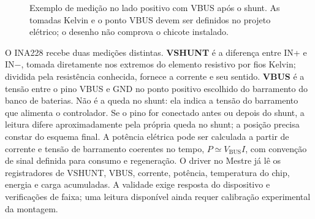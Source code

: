 \begin{figure}[htbp]\centering
{}
\caption{Exemplo de medição no lado positivo com VBUS após o shunt. As tomadas Kelvin e o ponto VBUS devem ser definidos no projeto elétrico; o desenho não comprova o chicote instalado.}\label{fig:shunt-kelvin}
\end{figure}

O INA228 recebe duas medições distintas. \textbf{VSHUNT} é a diferença entre IN+ e IN$-$, tomada diretamente nos extremos do elemento resistivo por fios Kelvin; dividida pela resistência conhecida, fornece a corrente e seu sentido. \textbf{VBUS} é a tensão entre o pino VBUS e GND no ponto positivo escolhido do barramento do banco de baterias. Não é a queda no shunt: ela indica a tensão do barramento que alimenta o controlador. Se o pino for conectado antes ou depois do shunt, a leitura difere aproximadamente pela própria queda no shunt; a posição precisa constar do esquema final. A potência elétrica pode ser calculada a partir de corrente e tensão de barramento coerentes no tempo, $P\simeq V_{\mathrm{BUS}}I$, com convenção de sinal definida para consumo e regeneração. O driver no Mestre já lê os registradores de VSHUNT, VBUS, corrente, potência, temperatura do chip, energia e carga acumuladas. A validade exige resposta do dispositivo e verificações de faixa; uma leitura disponível ainda requer calibração experimental da montagem.

